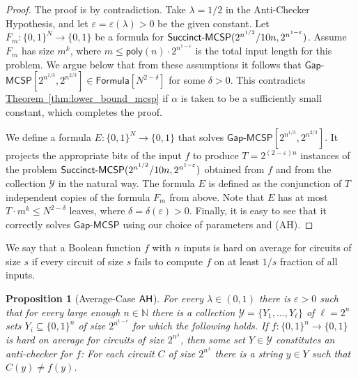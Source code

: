 \documentclass[11pt]{article}
\numberwithin{equation}{section}
\newtheorem{proposition}[theorem]{Proposition}
\theoremstyle{definition}
\theoremstyle{plain}
\newcommand{\expref}[2]{\hyperref[#2]{#1~\ref{#2}}}
\newcommand{\MCSP}{\ensuremath{{\sf MCSP}}\xspace}
\newcommand{\Succinct}{\ensuremath{{\sf Succinct}\text{-}\ensuremath{\MCSP}}\xspace}
\newcommand{\AH}{\ensuremath{{\sf AH}}\xspace}
\newcommand{\gapmcsp}{\mathsf{Gap}$-$\mathsf{MCSP}}
\begin{document}
\begin{proof}
  The proof is by contradiction. Take $\lambda = 1/2$ in the Anti-Checker Hypothesis, and let $\varepsilon = \varepsilon(\lambda)>0$ be the given constant. Let $F_m \colon \{0,1\}^N \to \{0,1\}$ be a formula
%
%
for $\Succinct(2^{n^{1/2}}/10n, 2^{n^{1 - \varepsilon}})$.
%
Assume $F_m$ has size $m^k$,  %
where $m \leq \mathsf{poly}(n) \cdot 2^{n^{1 - \varepsilon}}$ is the total input length for this problem. We argue below that from these assumptions it follows that $\gapmcsp[2^{n^{1/3}}, 2^{n^{2/3}}] \in \mathsf{Formula}[N^{2 - \delta}]$ for some $\delta > 0$. This contradicts \expref{Theorem}{thm:lower_bound_mcsp} if $\alpha$ is taken to be a sufficiently small constant, which completes the proof.

We define a formula $E \colon \{0,1\}^N \to \{0,1\}$ that solves $\gapmcsp[2^{n^{1/3}}, 2^{n^{2/3}}]$. It projects the appropriate bits of the input $f$ to produce $T = 2^{(2 - \varepsilon)n}$ instances of the problem $\Succinct(2^{n^{1/2}}/10n, 2^{n^{1 - \varepsilon}})$ obtained from $f$ and from the collection $\mathcal{Y}$ in the natural way. The formula $E$ is defined as the conjunction of $T$ independent copies of the formula $F_m$ from above. Note that $E$ has at most $T \cdot m^k \leq N^{2 - \delta}$ leaves, where $\delta  = \delta (\varepsilon) > 0$. Finally, it is easy to see that it correctly solves $\gapmcsp$ using our choice of parameters and (AH).
\end{proof}



We say that a Boolean function $f$ with $n$ inputs is hard on average for circuits of size $s$ if every circuit of size $s$ fails to compute $f$ on at least $1/s$ fraction of all inputs.

\begin{proposition}[Average-Case \AH]\label{p:AH_average} For every $\lambda\in (0,1)$ there is $\varepsilon > 0$ such that for every large enough $n \in \mathbb{N}$ there is a collection $\mathcal{Y} = \{Y_1, \ldots, Y_\ell\}$ of $\ell = 2^n$ sets $Y_i \subseteq \{0,1\}^n$ of size $2^{n^{1-\epsilon}}$ for which the following holds. If $f \colon \{0,1\}^n \to \{0,1\}$ is hard on average for circuits of size $2^{n^\lambda}$, then some set $Y \in \mathcal{Y}$ constitutes an anti-checker for $f$\emph{:} For each circuit $C$ of size $2^{n^{\lambda}}$ there is a string  $y \in Y$ such that $C(y)\ne f(y)$.
\end{proposition}
\end{document}
